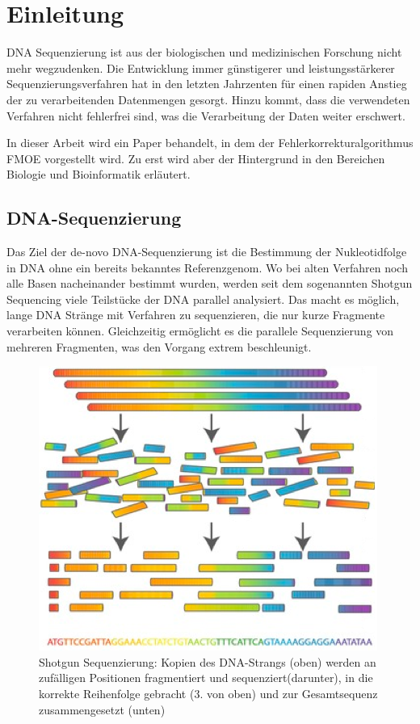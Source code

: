 \chapter{Einleitung}
\label{ch:einleitung}

DNA Sequenzierung ist aus der biologischen und medizinischen Forschung nicht mehr wegzudenken.
Die Entwicklung immer günstigerer und leistungsstärkerer Sequenzierungsverfahren hat in den letzten Jahrzenten für einen rapiden Anstieg der zu verarbeitenden Datenmengen gesorgt.
Hinzu kommt, dass die verwendeten Verfahren nicht fehlerfrei sind, was die Verarbeitung der Daten weiter erschwert.

In dieser Arbeit wird ein Paper behandelt, in dem der Fehlerkorrekturalgorithmus FMOE vorgestellt wird.
Zu erst wird aber der Hintergrund in den Bereichen Biologie und Bioinformatik erläutert.

\section{DNA-Sequenzierung}
\label{s:dna-seq} 

Das Ziel der de-novo DNA-Sequenzierung ist die Bestimmung der Nukleotidfolge in DNA ohne ein bereits bekanntes Referenzgenom.
Wo bei alten Verfahren noch alle Basen nacheinander bestimmt wurden, werden seit dem sogenannten Shotgun Sequencing viele Teilstücke der DNA parallel analysiert.
Das macht es möglich, lange DNA Stränge mit Verfahren zu sequenzieren, die nur kurze Fragmente verarbeiten können. %
Gleichzeitig ermöglicht es die parallele Sequenzierung von mehreren Fragmenten, was den Vorgang extrem beschleunigt.

\begin{figure}[h]
	\begin{center}
		\includegraphics{./img/shotgun_sequencing.png}
	\end{center}
	\caption{Shotgun Sequenzierung: Kopien des DNA-Strangs (oben) werden an zufälligen Positionen fragmentiert und sequenziert(darunter), in die korrekte Reihenfolge gebracht (3. von oben) und zur Gesamtsequenz zusammengesetzt (unten)}
	\label{fig:shotgun-sequencing}
\end{figure}

